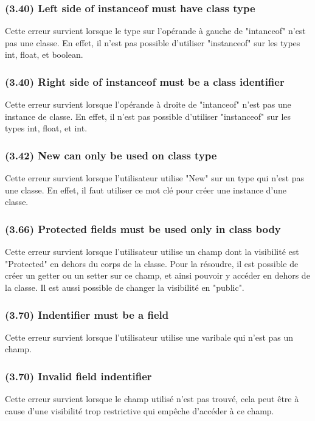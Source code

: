 \documentclass[12pt, a4paper, one side]{article}
\begin{document}
\subsubsection{(3.40) Left side of instanceof must have class type}
Cette erreur survient lorsque le type sur l'opérande à gauche de "intanceof" n'est pas une classe. En effet, il n'est pas possible d'utiliser "instanceof" sur les types int, float, et boolean.

\subsubsection{(3.40) Right side of instanceof must be a class identifier}
Cette erreur survient lorsque l'opérande à droite de "intanceof" n'est pas une instance de classe. En effet, il n'est pas possible d'utiliser "instanceof" sur les types int, float, et int.

\subsubsection{(3.42) New can only be used on class type}
Cette erreur survient lorsque l'utilisateur utilise "New" sur un type qui n'est pas une classe. En effet, il faut utiliser ce mot clé pour créer une instance d'une classe.

\subsubsection{(3.66) Protected fields must be used only in class body}
Cette erreur survient lorsque l'utilisateur utilise un champ dont la visibilité est "Protected" en dehors du corps de la classe. Pour la résoudre, il est possible de créer un getter ou un setter sur ce champ, et ainsi pouvoir y accéder en dehors de la classe. Il est aussi possible de changer la visibilité en "public".

\subsubsection{(3.70) Indentifier must be a field}
Cette erreur survient lorsque l'utilisateur utilise une varibale qui n'est pas un champ.

\subsubsection{(3.70) Invalid field indentifier}
Cette erreur survient lorsque le champ utilisé n'est pas trouvé, cela peut être à cause d'une visibilité trop restrictive qui empêche d'accéder à ce champ.
\end{document}
